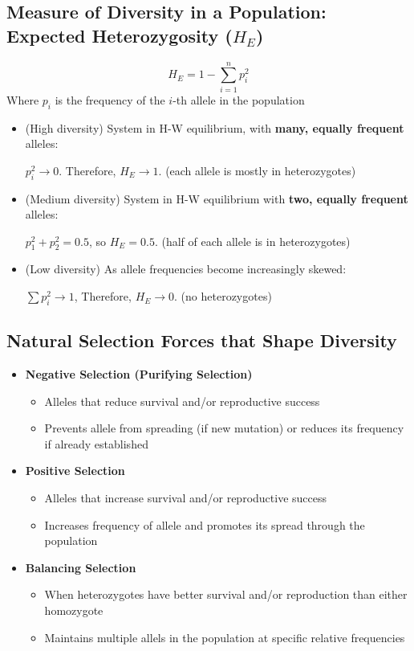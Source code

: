 \documentclass[10pt]{article}
\begin{document}
\subsection*{Measure of Diversity in a Population: Expected Heterozygosity ($H_E$)}
\[H_E = 1 - \sum_{i = 1}^n p_i^2\]
Where $p_i$ is the frequency of the $i$-th allele in the population
\begin{itemize}
	\item (High diversity) System in H-W equilibrium, with \textbf{many, equally frequent} alleles:
	\begin{center}
        $p_i^2 \rightarrow 0$.  Therefore, $H_E \rightarrow 1$.  (each allele is mostly in heterozygotes)
    \end{center}
    \item (Medium diversity) System in H-W equilibrium with \textbf{two, equally frequent} alleles:
    \begin{center}
        $p_1^2 + p_2^2 = 0.5$, so $H_E = 0.5$.  (half of each allele is in heterozygotes)
    \end{center}
    \item (Low diversity) As allele frequencies become increasingly skewed:
    \begin{center}
        $\sum p_i^2 \rightarrow 1$,  Therefore, $H_E \rightarrow 0$.  (no heterozygotes)
    \end{center}
\end{itemize}

\subsection*{Natural Selection Forces that Shape Diversity}
\begin{itemize}
	\item \textbf{Negative Selection (Purifying Selection)}
	\begin{itemize}
	    \item Alleles that reduce survival and/or reproductive success
	    \item Prevents allele from spreading (if new mutation) or reduces its frequency if already established
    \end{itemize}
	\item \textbf{Positive Selection}
	\begin{itemize}
	    \item Alleles that increase survival and/or reproductive success
	    \item Increases frequency of allele and promotes its spread through the population
    \end{itemize}
	\item \textbf{Balancing Selection}
	\begin{itemize}
	    \item When heterozygotes have better survival and/or reproduction than either homozygote
	    \item Maintains multiple allels in the population at specific relative frequencies
    \end{itemize}
\end{itemize}
\end{document}
